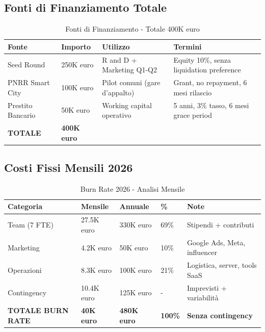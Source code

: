 \documentclass[11pt,a4paper]{report}
\begin{document}
\subsection{Fonti di Finanziamento Totale}
\begin{table}[H]
\centering
\caption{Fonti di Finanziamento - Totale 400K euro}
\label{tab:funding-sources}
\begin{tabular}{L{3.5cm} C{2cm} L{4cm} L{3cm}}
\toprule
{\bf Fonte} & {\bf Importo} & {\bf Utilizzo} & {\bf Termini} \\
\midrule
Seed Round & 250K euro & R and D + Marketing Q1-Q2 & Equity 10\%, senza liquidation preference \\
PNRR Smart City & 100K euro & Pilot comuni (gare d'appalto) & Grant, no repayment, 6 mesi rilascio \\
Prestito Bancario & 50K euro & Working capital operativo & 5 anni, 3\% tasso, 6 mesi grace period \\
\midrule
{\bf TOTALE} & {\bf 400K euro} & & \\
\bottomrule
\end{tabular}
\end{table}

\subsection{Costi Fissi Mensili 2026}
\begin{table}[H]
\centering
\caption{Burn Rate 2026 - Analisi Mensile}
\label{tab:burn-rate}
\begin{tabular}{L{2.5cm} C{1.5cm} C{1.5cm} C{1.5cm} C{1.5cm}}
\toprule
{\bf Categoria} & {\bf Mensile} & {\bf Annuale} & {\bf \%} & {\bf Note} \\
\midrule
Team (7 FTE) & 27.5K euro & 330K euro & 69\% & Stipendi + contributi \\
Marketing & 4.2K euro & 50K euro & 10\% & Google Ads, Meta, influencer \\
Operazioni & 8.3K euro & 100K euro & 21\% & Logistica, server, tools SaaS \\
Contingency & 10.4K euro & 125K euro & - & Imprevisti + variabilità \\
\midrule
{\bf TOTALE BURN RATE} & {\bf 40K euro} & {\bf 480K euro} & {\bf 100\%} & {\bf Senza contingency} \\
\bottomrule
\end{tabular}
\end{table}
\end{document}
